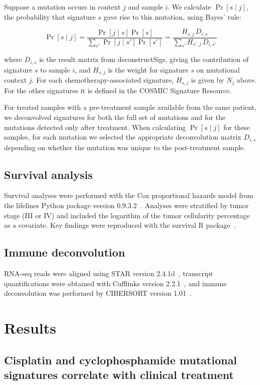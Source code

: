 \documentclass{bmcart}
\begin{document}
Suppose a mutation occurs in context $j$ and sample $i$. We calculate $\Pr[s \mid j]$, the probability that signature $s$ gave rise to this mutation, using Bayes' rule:

\[
\Pr[s \mid j] = \frac{\Pr[j \mid s] \Pr[s]}{\sum_{s'}{\Pr[j \mid s']\Pr[s']}} = \frac{H_{s,j} \, D_{i,s}}{\sum_{s'}{H_{s',j} \, D_{i,s'}}}
\]

where $D_{i,s}$ is the result matrix from deconstructSigs, giving the contribution of signature $s$ to sample $i$, and $H_{s,j}$ is the weight for signature $s$ on mutational context $j$. For each chemotherapy-associated signature, $H_{s,j}$ is given by $N_j$ above. For the other signatures it is defined in the COSMIC Signature Resource.

For treated samples with a pre-treatment sample available from the same patient, we deconvolved signatures for both the full set of mutations and for the mutations detected only after treatment. When calculating $\Pr[s \mid j]$ for these samples, for each mutation we selected the appropriate deconvolution matrix $D_{i,s}$ depending on whether the mutation was unique to the post-treatment sample.

\subsection*{Survival analysis}
Survival analyses were performed with the Cox proportional hazards model from the lifelines Python package version 0.9.3.2~\cite{cameron2017}. Analyses were stratified by tumor stage (III or IV) and included the logarithm of the tumor cellularity percentage as a covariate. Key findings were reproduced with the survival R package~\cite{survivalpackage}.

\subsection*{Immune deconvolution}
RNA-seq reads were aligned using STAR version 2.4.1d~\cite{dobin2013}, transcript quantifications were obtained with Cufflinks version 2.2.1~\cite{trapnell2010}, and immune deconvolution was performed by CIBERSORT version 1.01~\cite{newman2015}. 


\section*{Results}

\subsection*{Cisplatin and cyclophosphamide mutational signatures correlate with clinical treatment}
\end{document}
